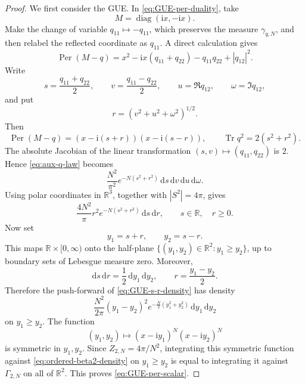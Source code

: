 \documentclass[10pt,a4paper]{amsart}
\DeclareMathOperator{\Per}{Per}
\newcommand{\R}{\mathbb R}
\DeclareMathOperator{\Tr}{Tr}
\newcommand{\dd}{\mathrm d}
\DeclareMathOperator{\diag}{diag}
\newcommand{\ii}{\mathrm i}
\begin{document}
\begin{proof}
We first consider the GUE.  In \eqref{eq:GUE-per-duality}, take
\[
  M=\diag(\ii x,-\ii x).
\]
Make the change of variable \(q_{11}\mapsto-q_{11}\), which preserves the
measure \(\gamma_{q,N}\), and then relabel the reflected coordinate as
\(q_{11}\).  A direct calculation gives
\[
  \Per(M-q)
  =
  x^2-\ii x(q_{11}+q_{22})-q_{11}q_{22}+|q_{12}|^2.
\]
Write
\[
  s=\frac{q_{11}+q_{22}}2,
  \qquad
  v=\frac{q_{11}-q_{22}}2,
  \qquad
  u=\Re q_{12},
  \qquad
  \omega=\Im q_{12},
\]
and put
\[
  r=(v^2+u^2+\omega^2)^{1/2}.
\]
Then
\[
  \Per(M-q)
  =
  (x-\ii(s+r))(x-\ii(s-r)),
  \qquad
  \Tr q^2=2(s^2+r^2).
\]
The absolute Jacobian of the linear transformation
\((s,v)\mapsto(q_{11},q_{22})\) is \(2\).  Hence
\eqref{eq:aux-q-law} becomes
\[
  \frac{N^2}{\pi^2}e^{-N(s^2+r^2)}
  \,\dd s\,\dd v\,\dd u\,\dd\omega.
\]
Using polar coordinates in \(\R^3\), together with \(|S^2|=4\pi\), gives
\begin{equation}\label{eq:GUE-s-r-density}
  \frac{4N^2}{\pi}r^2e^{-N(s^2+r^2)}\,\dd s\,\dd r,
  \qquad s\in\R,\quad r\ge0.
\end{equation}
Now set
\[
  y_1=s+r,
  \qquad
  y_2=s-r.
\]
This maps \(\R\times[0,\infty)\) onto the half-plane
\(\{(y_1,y_2)\in\R^2:y_1\ge y_2\}\), up to boundary sets of Lebesgue
measure zero.  Moreover,
\[
  \dd s\,\dd r=\frac12\,\dd y_1\,\dd y_2,
  \qquad
  r=\frac{y_1-y_2}{2}.
\]
Therefore the push-forward of \eqref{eq:GUE-s-r-density} has density
\begin{equation}\label{eq:ordered-beta2-density}
  \frac{N^2}{2\pi}(y_1-y_2)^2
  e^{-\frac N2(y_1^2+y_2^2)}\,\dd y_1\,\dd y_2
\end{equation}
on \(y_1\ge y_2\).  The function
\[
  (y_1,y_2)\longmapsto
  (x-\ii y_1)^N(x-\ii y_2)^N
\]
is symmetric in \(y_1,y_2\).  Since \(Z_{2,N}=4\pi/N^2\), integrating
this symmetric function against \eqref{eq:ordered-beta2-density} on
\(y_1\ge y_2\) is equal to integrating it against \(\Gamma_{2,N}\) on
all of \(\R^2\).  This proves \eqref{eq:GUE-per-scalar}.


\end{proof}
\end{document}
